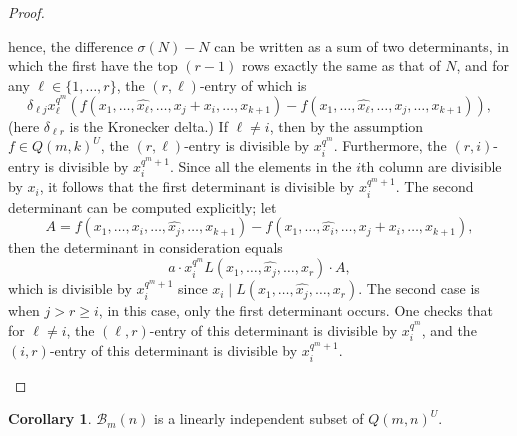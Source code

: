 \documentclass[12pt,a4paper]{report}
\theoremstyle{definition}
\newtheorem{corollary}{Corollary}[theorem]
\theoremstyle{remark}
\theoremstyle{definition}
\begin{document}
\begin{proof}
\begin{itemize}
            hence, the difference $\sigma(N)-N$ can be written as a sum of two determinants, in which the first have the top $(r-1)$ rows exactly the same as that of $N$, and for any $\ell\in \{1, \ldots, r\}$, the $(r, \ell)$-entry of which is
            \begin{equation*}
                    \delta_{\ell j}x_{\ell}^{q^m}(f(x_1, \ldots, \widehat{x_{\ell}}, \ldots, x_j+x_i, \ldots, x_{k+1}) - f(x_1, \ldots, \widehat{x_{\ell}}, \ldots, x_j, \ldots, x_{k+1})),
            \end{equation*}
            (here $\delta_{\ell r}$ is the Kronecker delta.) If $\ell\neq i$, then by the assumption $f\in Q(m, k)^U$, the $(r, \ell)$-entry is divisible by $x_i^{q^m}$. Furthermore, the $(r, i)$-entry is divisible by $x_i^{q^m+1}$. Since all the elements in the $i$th column are divisible by $x_i$, it follows that the first determinant is divisible by $x_i^{q^m+1}$. The second determinant can be computed explicitly; let 
            \begin{equation*}
                A = f(x_1, \ldots, x_i, \ldots, \widehat{x_j}, \ldots, x_{k+1}) - f(x_1, \ldots, \widehat{x_i}, \ldots, x_{j}+x_i, \ldots, x_{k+1}),
            \end{equation*}
            then the determinant in consideration equals
            \begin{equation*}
                a\cdot x_i^{q^m}L(x_1, \ldots, \widehat{x_j}, \ldots, x_r)\cdot A,
            \end{equation*}
            which is divisible by $x_i^{q^m+1}$ since $x_i\mid L(x_1, \ldots, \widehat{x_j}, \ldots, x_r)$. The second case is when $j>r\geq i$, in this case, only the first determinant occurs. One checks that for $\ell\neq i$, the $(\ell, r)$-entry of this determinant is divisible by $x_i^{q^m}$, and the $(i, r)$-entry of this determinant is divisible by $x_i^{q^m+1}$.\qedhere
        \end{itemize}
\end{proof}
\begin{corollary}\label{cor:Y_is_polynomial}
    $\mathcal{B}_m(n)$ is a linearly independent subset of $Q(m, n)^U$.
\end{corollary}
\end{document}
